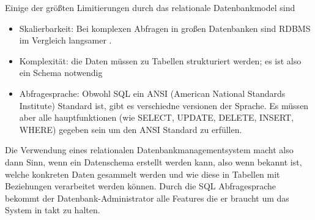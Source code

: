 Einige der größten Limitierungen \cite{MELD.CH2-relationaleDB.rdbmsBuch} durch das relationale Datenbankmodel sind
\begin{itemize}
\item Skalierbarkeit: Bei komplexen Abfragen in großen Datenbanken sind RDBMS im Vergleich langsamer \cite{MELD.CH2-relationaleDB.performacne}.
\item Komplexität: die Daten müssen zu Tabellen strukturiert werden; es ist also ein Schema notwendig
\item Abfragesprache: Obwohl SQL ein ANSI (American National Standards Institute) Standard ist, gibt es verschiedne versionen der Sprache. Es müssen aber alle hauptfunktionen (wie SELECT, UPDATE, DELETE, INSERT, WHERE) gegeben sein um den ANSI Standard zu erfüllen.
\end{itemize}

Die Verwendung eines relationalen Datenbankmanagementsystem macht also dann Sinn, wenn ein Datenschema erstellt werden kann, also wenn bekannt ist, welche konkreten Daten gesammelt werden und wie diese in Tabellen mit Beziehungen verarbeitet werden können. Durch die SQL Abfragesprache bekommt der Datenbank-Administrator alle Features die er braucht um das System in takt zu halten.